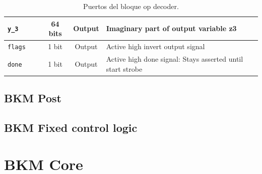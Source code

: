\documentclass[10pt,a4paper]{book}
\begin{document}
\begin{table}[h]
\begin{tabular}{lccl}
         \verb|y_3      |  &  64 bits     &  Output         &  Imaginary part of output variable z3                           \\ \hline
         \verb|flags    |  &  1  bit      &  Output         &  Active high invert output signal                               \\ \hline
         \verb|done     |  &  1  bit      &  Output         &  Active high done signal: Stays asserted until start strobe     \\ \hline
      \end{tabular}
      \caption{Puertos del bloque op decoder.}
      \label{tab:bkm_fixed_ports}
      \end{table}
      \subsection{BKM Post}
      \subsection{BKM Fixed control logic}


   \section{BKM Core}
\end{document}
